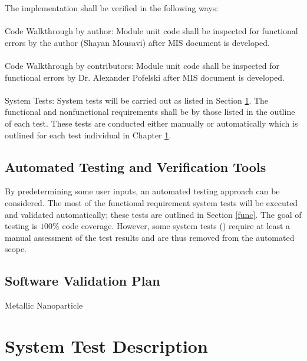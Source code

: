 \documentclass[12pt, titlepage]{article}
\begin{document}


The implementation shall be verified in the following ways:\\
\\
Code Walkthrough by author:  Module unit code shall be inspected for functional errors by the author (Shayan Mousavi) after MIS document is developed.\\  
\\
Code Walkthrough by contributors: Module unit code shall be inspected for functional errors by Dr. Alexander Pofelski after MIS document is developed.\\
\\
System Tests:  System tests will be carried out as listed in Section \ref{systest}. The functional and nonfunctional requirements shall be by those listed in the outline of each test. These tests are conducted either manually or automatically which is outlined for each test individual in Chapter \ref{systest}. 

\subsection{Automated Testing and Verification Tools}

By predetermining some user inputs, an automated testing approach can be
considered. The most of the functional requirement system tests will be executed and
validated automatically; these tests are outlined in Section \ref{func}. The goal of testing is $100\%$ code coverage. However, some system tests () require at least a manual assessment of the test results and
are thus removed from the automated scope.
\subsection{Software Validation Plan}

Metallic Nanoparticle 

\section{System Test Description}
\label{systest}
\end{document}
